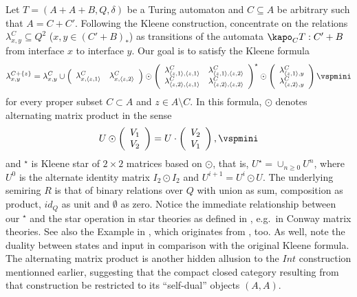 \documentclass{eptcs}
\begin{document}
Let $T=(A+A+B, Q,\delta )$ be a Turing automaton and $C\subseteq A$ be arbitrary 
such that $A=C+C'$. Following the Kleene construction, concentrate on the relations 
$\lambda _{x,y}^C\subseteq Q^2$ ($x,y\in (C'+B)_*$) as transitions of the automata
$\kapo _C T: C'+B$ from interface $x$ to interface $y$. Our goal is to satisfy the
Kleene formula
\vspmini
\[ \lambda _{x,y}^{C+\{ z\}}=\lambda _{x,y}^C\cup 
\left(
\begin{array}{cc}
\lambda ^C_{x,\langle z,1\rangle } & \lambda ^C_{x,\langle z,2\rangle }
\end{array}
\right)
\odot
\left(
\begin{array}{cc}
\lambda ^C_{\langle z,1\rangle ,\langle z,1\rangle } &
\lambda ^C_{\langle z,1\rangle ,\langle z,2\rangle } \\
\lambda ^C_{\langle z,2\rangle ,\langle z,1\rangle } &
\lambda ^C_{\langle z,2\rangle ,\langle z,2\rangle }
\end{array}
\right)
^{\star }
\odot 
\left(
\begin{array}{c}
\lambda ^C_{\langle z,1\rangle ,y} \\
\lambda ^C_{\langle z,2\rangle ,y}
\end{array} 
\right)
\vspmini \]
for every proper subset $C\subset A$ and $z\in A\setminus C$. In this
formula, $\odot $ denotes alternating matrix product in the sense
\vspmini
\[ U\odot 
\left(
\begin{array}{c}
V_1 \\ V_2
\end{array}
\right)
=
U\cdot
\left(
\begin{array}{c}
V_2 \\ V_1
\end{array}
\right)
,\vspmini \]
and $^{\star}$ is Kleene star of $2\times 2$ matrices based on $\odot $, that is,
$U^{\star }=\cup _{n\geq 0} U^n$, where $U^0$ is the alternate identity matrix 
$I_2\odot I_2$ and 
$U^{i+1}=U^i\odot U$. The underlying semiring $R$ is that of binary relations
over $Q$ with union as sum, composition as product, $id_Q$ as unit and $\emptyset $
as zero. Notice the immediate relationship between our $^{\star }$ and the star
operation in star theories as defined in \cite{iter}, e.g.\ in Conway matrix
theories. See also the Example in \cite{tra}, which originates from
\cite{iter}, too. As well, note the 
duality between states and input in comparison with the original Kleene formula.
The alternating matrix product is another hidden allusion to the $Int$ construction
\cite{tra} mentionned earlier, suggesting that the compact closed category resulting
from that construction be restricted to its ``self-dual'' objects $(A,A)$.
\end{document}
